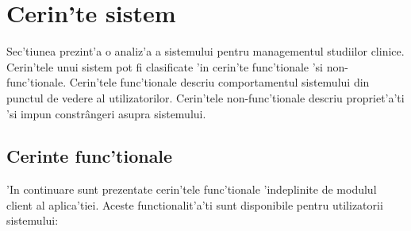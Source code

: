\documentclass[12pt,a4paper,twoside]{report}
\begin{document}
\section{Cerin'te sistem}
Sec'tiunea prezint'a o analiz'a a sistemului pentru managementul studiilor clinice. Cerin'tele unui sistem pot fi clasificate 'in cerin'te func'tionale 'si non-func'tionale. Cerin'tele func'tionale descriu comportamentul sistemului din punctul de vedere al utilizatorilor. Cerin'tele non-func'tionale descriu propriet'a'ti 'si impun constr\^angeri asupra sistemului.

\subsection{Cerinte func'tionale}
'In continuare sunt prezentate cerin'tele func'tionale 'indeplinite de modulul client al aplica'tiei. Aceste functionalit'a'ti sunt disponibile pentru utilizatorii sistemului:
\end{document}
